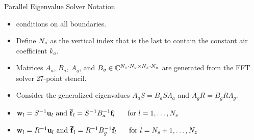 \documentclass[handout]{beamer}
\begin{document}
\begin{frame}{Parallel Eigenvalue Solver Notation}
\begin{itemize}
\item \somm conditions on all boundaries.\\[1em]
\item Define ${N_s}$ as the vertical index that is the last to contain the constant air coefficient $k_a$.\\[1em]
\item Matrices $A_a$, $B_a$, $A_g$, and $B_g\in\mathbb{C}^{{N_x}\cdot{N_y}\times{N_x}\cdot{N_y}}$ are generated from the FFT solver 27-point stencil.\\[1em]
\item Consider the generalized eigenvalues $A_a S = B_a S\Lambda_a$  and $A_g R = B_g R\Lambda_g$.\\[1em]
\item $\mathbf{w}_l = S^{-1}\mathbf{u}_l \text{ and } \overline{\mathbf{f}}_l = S^{-1}B_a^{-1}\mathbf{f}_l \hspace{5mm}\text{ for }l=1,\dots,N_s$\\[1em]
\item $\mathbf{w}_l = R^{-1}\mathbf{u}_l \text{ and } \overline{\mathbf{f}}_l = R^{-1}B_g^{-1}\mathbf{f}_l \hspace{5mm}\text{ for }l={N_s}+1,\dots,{N_z}$
\end{itemize}
%
%
\end{frame}
\end{document}
